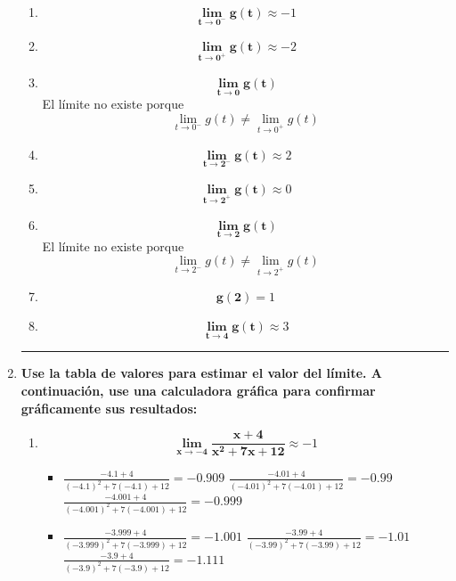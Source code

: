 \documentclass[12pt]{article}
\begin{document}
\begin{enumerate}[label=\textbf{\arabic*.}]
                \begin{enumerate}[label=\textbf{\alph*.}]
                    \item \[\bm{\lim_{t \to 0 ^-} g(t)} \approx -1\]
                    \item \[\bm{\lim_{t \to 0 ^+} g(t)} \approx -2\] \newpage
                    \item \[\bm{\lim_{t \to 0} g(t)}\] El límite no existe porque \[\lim_{t \to 0 ^-} g(t) \ne \lim_{t \to 0 ^+} g(t)\]
                    \item \[\bm{\lim_{t \to 2 ^-} g(t)} \approx 2\]
                    \item \[\bm{\lim_{t \to 2 ^+} g(t)} \approx 0\]
                    \item \[\bm{\lim_{t \to 2} g(t)}\] El límite no existe porque \[\lim_{t \to 2 ^-} g(t) \ne \lim_{t \to 2 ^+} g(t)\]
                    \item \[\bm{g(2)} = 1\]
                    \item \[\bm{\lim_{t \to 4} g(t)} \approx 3\]
                \end{enumerate}
            
            \vspace{1cm}\hrule
            \item \textbf{Use la tabla de valores para estimar el valor del límite. A continuación, use una calculadora gráfica para confirmar gráficamente sus resultados:}
                \begin{enumerate}[label=\textbf{\arabic*)}] 
                    \item \[\bm{\lim_{x \to -4} \frac{x + 4}{x ^2 + 7x + 12}} \approx -1\]
                        
                        \begin{itemize}
                            \item $\frac{-4.1 + 4}{(-4.1)^2 + 7(-4.1) + 12} =  -0.909$ \hspace{1cm} $\frac{-4.01 + 4}{(-4.01)^2 + 7(-4.01) + 12} =  -0.99$ \vspace{0.2cm} \\$\frac{-4.001 + 4}{(-4.001)^2 + 7(-4.001) + 12} =  -0.999$
                            \item $\frac{-3.999 + 4}{(-3.999)^2 + 7(-3.999) + 12} =  -1.001$ \hspace{1cm} $\frac{-3.99 + 4}{(-3.99)^2 + 7(-3.99) + 12} =  -1.01$ \vspace{0.2cm} \\$\frac{-3.9 + 4}{(-3.9)^2 + 7(-3.9) + 12} =  -1.111$ 
                        \end{itemize}


\end{enumerate}
\end{enumerate}
\end{document}
